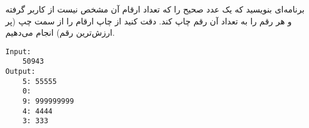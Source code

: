 \documentclass[../main.tex]{subfiles}
\begin{document}

برنامه‌ای بنويسيد كه یک عدد صحيح را که تعداد ارقام آن مشخص نیست از کاربر گرفته و هر رقم را به تعداد آن رقم چاپ کند.
دقت کنید از چاپ ارقام را از سمت چپ (پر ارزش‌ترین رقم) انجام می‌دهیم.

\begin{latin}
\begin{verbatim}
Input:
    50943
Output:
    5: 55555
    0:
    9: 999999999
    4: 4444
    3: 333
\end{verbatim}
\end{latin}
\end{document}

